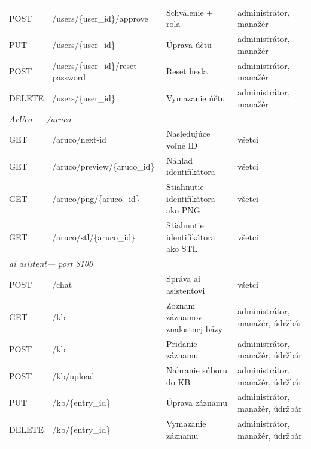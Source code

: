 \begin{table}[H]
{\begin{tabular}{|l|l|l|l|}
                  POST            & /users/\{user\_id\}/approve                & Schválenie + rola                 & administrátor, manažér           \\
                  PUT             & /users/\{user\_id\}                        & Úprava účtu                       & administrátor, manažér           \\
                  POST            & /users/\{user\_id\}/reset-password         & Reset hesla                       & administrátor, manažér           \\
                  DELETE          & /users/\{user\_id\}                        & Vymazanie účtu                    & administrátor, manažér           \\
                  \hline
                  \multicolumn{4}{|l|}{\textit{ArUco — /aruco}}                                                                               \\
                  \hline
                  GET             & /aruco/next-id                             & Nasledujúce voľné ID              & všetci                   \\
                  GET             & /aruco/preview/\{aruco\_id\}               & Náhľad identifikátora             & všetci                   \\
                  GET             & /aruco/png/\{aruco\_id\}                   & Stiahnutie identifikátora ako PNG & všetci                   \\
                  GET             & /aruco/stl/\{aruco\_id\}                   & Stiahnutie identifikátora ako STL & všetci                   \\
                  \hline
                  \multicolumn{4}{|l|}{\textit{\acrshort{ai} asistent— port 8100}}                                                                      \\
                  \hline
                  POST            & /chat                                      & Správa \acrshort{ai} asistentovi             & všetci                   \\
                  GET             & /kb                                        & Zoznam záznamov znalostnej bázy   & administrátor, manažér, údržbár  \\
                  POST            & /kb                                        & Pridanie záznamu                  & administrátor, manažér, údržbár  \\
                  POST            & /kb/upload                                 & Nahranie súboru do KB             & administrátor, manažér, údržbár  \\
                  PUT             & /kb/\{entry\_id\}                          & Úprava záznamu                    & administrátor, manažér, údržbár  \\
                  DELETE          & /kb/\{entry\_id\}                          & Vymazanie záznamu                 & administrátor, manažér, údržbár  \\
                  \hline
            \end{tabular}%
      }
\end{table}

